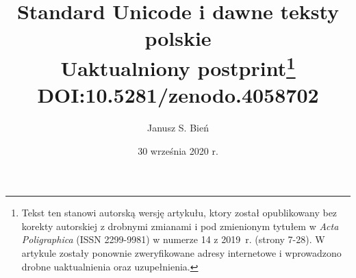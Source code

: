 \documentclass{mwart}
\begin{document}
\gappto\captionspolish{\renewcommand{\figurename}{Ilustracja}}

\renewcommand{\topfraction}{0.9}	
\setcounter{topnumber}{4}
\setcounter{totalnumber}{4}

% 
\title{Standard Unicode i dawne teksty polskie\\Uaktualniony postprint\footnote{Tekst ten
    stanowi autorską wersję artykułu, ktory został opublikowany bez
    korekty autorskiej z drobnymi zmianami i pod zmienionym tytułem w
    \textit{Acta Poligraphica} (ISSN 2299-9981) w numerze 14 z 2019~r.
    (strony 7-28). W artykule zostały ponownie zweryfikowane adresy
    internetowe i wprowadzono drobne uaktualnienia oraz
    uzupełnienia.}\\DOI:10.5281/zenodo.4058702}

\author{Janusz S. Bień}

\date{30 września 2020 r.}

\maketitle




\end{document}
